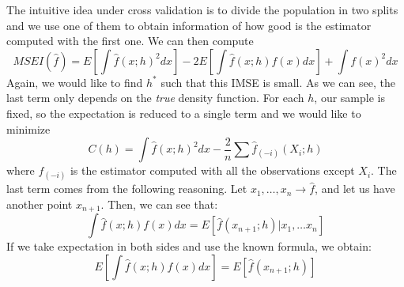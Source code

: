   The intuitive idea under cross validation is to divide the population in two splits and we use one of them to obtain information of how good is the estimator computed with the first one. We can then compute
  \[
MSEI(\hat f) = E \left[ \int \hat f (x;h)^2 dx\right] - 2E\left[ \int \hat f (x;h)f(x) dx \right] + \int f(x)^2 dx
  \]
  Again, we would like to find \(h^*\) such that this IMSE is small. As we can see, the last term only depends on the \emph{true} density function. For each \(h\), our sample is fixed, so the expectation is reduced to a single term and we would like to minimize
  \[
  C(h) =   \int \hat f (x;h)^2 dx - \frac{2}{n} \sum \hat f_{(-i)} (X_i;h)
  \]
  where \(f_{(-i)}\) is the estimator computed with all the observations except \(X_i\). The last term comes from the following reasoning. Let \(x_1,\dots,x_n \to \hat f\), and let us have another point \(x_{n+1}\). Then, we can see that:
  \[
  \int \hat f (x;h) f(x) dx = E \left[ \hat f (x_{n+1};h) | x_1,\dots x_n \right]
  \]
  If we take expectation in both sides and use the known formula, we obtain:
  \[
  E\left[ \int \hat f (x;h) f(x) dx\right] = E \left[ \hat f (x_{n+1};h) \right]
  \]

